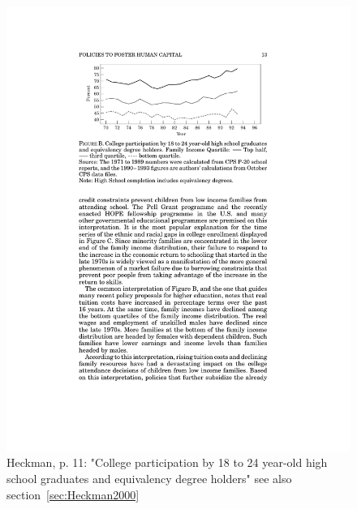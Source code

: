 \documentclass[12pt,a4paper]{article}
\begin{document}
    \begin{figure}[ht]
      \centering
      \includegraphics[width=12cm]{Meeting 10 Policies to foster human capital - Seite 11.pdf}
      \caption{Heckman, p. 11: "College participation by 18 to 24 year-old high school graduates and equivalency degree holders" see also section~\ref{sec:Heckman2000}}
      \label{fig:Heckman collegeparticipation}
    \end{figure}
\end{document}
